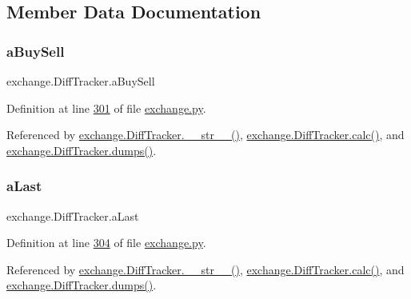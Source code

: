 \subsection{Member Data Documentation}
\mbox{\label{classexchange_1_1_diff_tracker_ae6108d1ec0cdf3b195ed5bb7c8b529b2}} 
\subsubsection{\texorpdfstring{a\+Buy\+Sell}{aBuySell}}
{\footnotesize\ttfamily exchange.\+Diff\+Tracker.\+a\+Buy\+Sell}



Definition at line \hyperlink{exchange_8py_source_l00301}{301} of file \hyperlink{exchange_8py_source}{exchange.\+py}.



Referenced by \hyperlink{exchange_8py_source_l00336}{exchange.\+Diff\+Tracker.\+\_\+\+\_\+str\+\_\+\+\_\+()}, \hyperlink{exchange_8py_source_l00309}{exchange.\+Diff\+Tracker.\+calc()}, and \hyperlink{exchange_8py_source_l00385}{exchange.\+Diff\+Tracker.\+dumps()}.

\mbox{\label{classexchange_1_1_diff_tracker_ae428ab91ae6471c4ad8b566540fb035e}} 
\subsubsection{\texorpdfstring{a\+Last}{aLast}}
{\footnotesize\ttfamily exchange.\+Diff\+Tracker.\+a\+Last}



Definition at line \hyperlink{exchange_8py_source_l00304}{304} of file \hyperlink{exchange_8py_source}{exchange.\+py}.



Referenced by \hyperlink{exchange_8py_source_l00336}{exchange.\+Diff\+Tracker.\+\_\+\+\_\+str\+\_\+\+\_\+()}, \hyperlink{exchange_8py_source_l00309}{exchange.\+Diff\+Tracker.\+calc()}, and \hyperlink{exchange_8py_source_l00385}{exchange.\+Diff\+Tracker.\+dumps()}.


